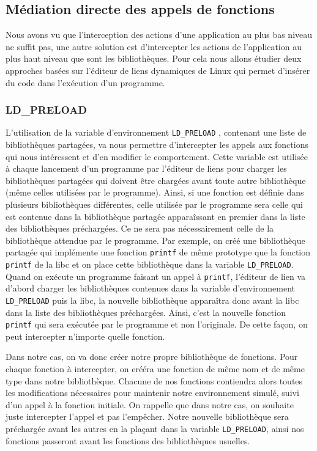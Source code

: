 \subsection{Médiation directe des appels de fonctions}

Nous avons vu que l'interception des actions d'une application au plus bas
niveau ne suffit pas, une autre solution est d'intercepter les actions de
l'application au plus haut niveau que sont les bibliothèques. Pour cela nous
allons étudier deux approches basées sur l'éditeur de liens dynamiques de Linux
qui permet d'insérer du code dans l'exécution d'un programme.

\subsubsection{LD\_PRELOAD}
\label{paragraphe:LDPreload}

L'utilisation de la variable d'environnement \texttt{LD\_PRELOAD}
\citep{LDPreload}, contenant une liste de bibliothèques partagées, va nous
permettre d'intercepter les appels aux fonctions qui nous intéressent et d'en
modifier le comportement. Cette variable est utilisée à chaque lancement d'un
programme par l'éditeur de liens pour charger les bibliothèques partagées qui
doivent être chargées avant toute autre bibliothèque (même celles utilisées par
le programme). Ainsi, si une fonction est définie dans plusieurs bibliothèques
différentes, celle utilisée par le programme sera celle qui est contenue dans la
bibliothèque partagée apparaîssant en premier dans la liste des bibliothèques
préchargées. Ce ne sera pas nécessairement celle de la bibliothèque
attendue par le programme. Par exemple, on créé une bibliothèque partagée qui
implémente une fonction \texttt{printf} de même prototype que la
fonction \texttt{printf} de la libc et on place cette bibliothèque dans la
variable \texttt{LD\_PRELOAD}. Quand on exécute un programme faisant un appel
à \texttt{printf}, l'éditeur de lien va d'abord charger les bibliothèques
contenues dans la variable d'environnement \texttt{LD\_PRELOAD} puis la libc, la
nouvelle bibliothèque apparaîtra donc avant la libc dans la liste des
bibliothèques préchargées. Ainsi, c'est la nouvelle fonction \texttt{printf}
qui sera exécutée par le programme et non l'originale. De cette façon, on peut
intercepter n'importe quelle fonction.

Dans notre cas, on va donc créer notre propre bibliothèque de fonctions. Pour
chaque fonction à intercepter, on crééra une
fonction de même nom et de même type dans notre bibliothèque. Chacune de nos
fonctions contiendra alors toutes les modifications nécessaires pour maintenir
notre environnement simulé, suivi d'un appel à la fonction initiale. On rappelle
que dans notre cas, on souhaite juste intercepter l'appel et pas l'empêcher. Notre nouvelle bibliothèque sera préchargée avant les autres en la plaçant dans
la variable \texttt{LD\_PRELOAD}, ainsi nos fonctions passeront avant les
fonctions des bibliothèques usuelles.

